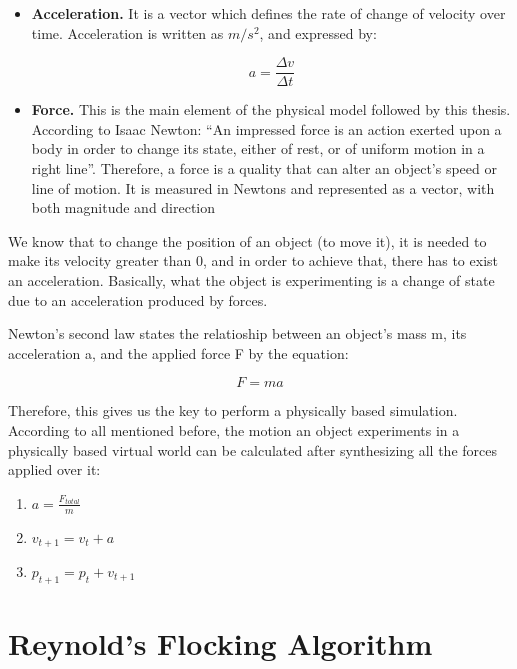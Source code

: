 \begin{itemize}
\item{{\bf Acceleration.} It is a vector which defines the rate of change of velocity over time. Acceleration is written as $m/s^2$, and expressed by:}

\begin{equation}
  a=\frac{\Delta v}{\Delta t}
\end{equation}

\item{{\bf Force.} This is the main element of the physical model followed by this thesis. 
 According to Isaac Newton: ``An impressed force is an action exerted upon a body in order to change its state, either of rest, or of uniform motion in a right line''.
 Therefore, a force is a quality that can alter an object's speed or line of motion. It is measured in Newtons and represented as a vector, with both magnitude and direction}

\end{itemize}

We know that to change the position of an object (to move it), it is needed to make its velocity greater than 0, and in order to achieve that, there has to exist an acceleration. Basically, what the object is experimenting is a change of state due to an acceleration produced by forces.

Newton's second law states the relatioship between an object's mass m, its acceleration a, and the applied force F by the equation:

\begin{equation}
  F=ma
\end{equation}

Therefore, this gives us the key to perform a physically based simulation. According to all mentioned before, the motion an object experiments in a physically based virtual world can be calculated after synthesizing all the forces applied over it:

\begin{enumerate}
\item $a = \frac{F_{total}}{m}$
\item $v_{t+1} = v_{t}+a$
\item $p_{t+1} = p_{t}+v_{t+1}$
\end{enumerate}

\section{Reynold's Flocking Algorithm}

